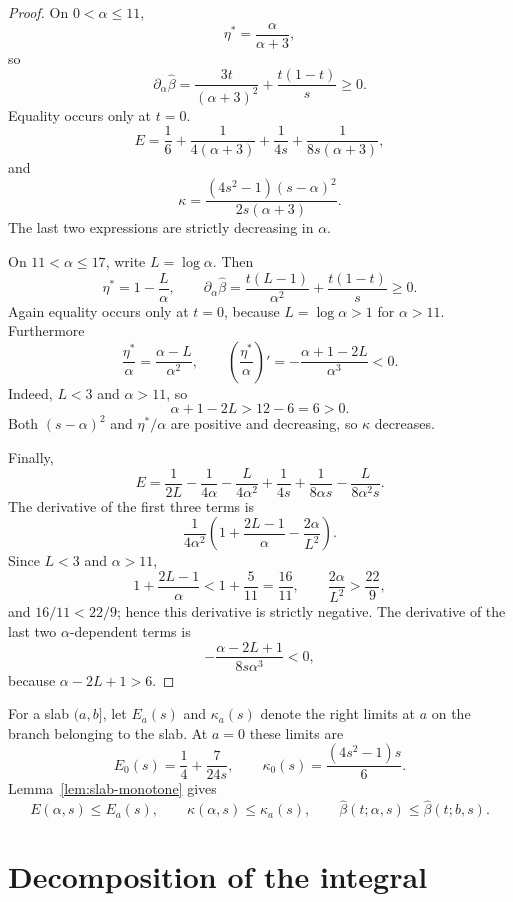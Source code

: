 \documentclass[11pt]{amsart}
\theoremstyle{definition}
\newcommand{\etaStar}{\eta^{\ast}}
\newcommand{\betaHat}{\widehat\beta}
\begin{document}
\begin{proof}
On $0<\alpha\le11$,
\[
 \etaStar=\frac{\alpha}{\alpha+3},
\]
so
\[
 \partial_\alpha\betaHat
 =\frac{3t}{(\alpha+3)^2}+\frac{t(1-t)}s\ge0.
\]
Equality occurs only at $t=0$.
\[
 E=\frac16+\frac1{4(\alpha+3)}
 +\frac1{4s}+\frac1{8s(\alpha+3)},
\]
and
\[
 \kappa
 =\frac{(4s^2-1)(s-\alpha)^2}{2s(\alpha+3)}.
\]
The last two expressions are strictly decreasing in $\alpha$.

On $11<\alpha\le17$, write $L=\log\alpha$.  Then
\[
 \etaStar=1-\frac L\alpha,
 \qquad
 \partial_\alpha\betaHat
 =\frac{t(L-1)}{\alpha^2}+\frac{t(1-t)}s\ge0.
\]
Again equality occurs only at $t=0$, because $L=\log\alpha>1$ for $\alpha>11$.
Furthermore
\[
 \frac{\etaStar}{\alpha}
 =\frac{\alpha-L}{\alpha^2},
 \qquad
 \left(\frac{\etaStar}{\alpha}\right)'
 =-\frac{\alpha+1-2L}{\alpha^3}<0.
\]
Indeed, $L<3$ and $\alpha>11$, so
\[
 \alpha+1-2L>12-6=6>0.
\]
Both $(s-\alpha)^2$ and $\etaStar/\alpha$ are positive and decreasing, so $\kappa$ decreases.

Finally,
\[
 E=
 \frac1{2L}-\frac1{4\alpha}-\frac{L}{4\alpha^2}
 +\frac1{4s}+\frac1{8\alpha s}-\frac{L}{8\alpha^2s}.
\]
The derivative of the first three terms is
\[
 \frac1{4\alpha^2}
 \left(1+\frac{2L-1}{\alpha}-\frac{2\alpha}{L^2}\right).
\]
Since $L<3$ and $\alpha>11$,
\[
 1+\frac{2L-1}{\alpha}
 <1+\frac5{11}=\frac{16}{11},
 \qquad
 \frac{2\alpha}{L^2}>\frac{22}{9},
\]
and $16/11<22/9$; hence this derivative is strictly negative.  The derivative of the last two $\alpha$-dependent terms is
\[
 -\frac{\alpha-2L+1}{8s\alpha^3}<0,
\]
because $\alpha-2L+1>6$.
\end{proof}

For a slab $(a,b]$, let $E_a(s)$ and $\kappa_a(s)$ denote the right limits at $a$ on the branch belonging to the slab.  At $a=0$ these limits are
\begin{equation}\label{eq:a0-limits}
 E_0(s)=\frac14+\frac7{24s},
 \qquad
 \kappa_0(s)=\frac{(4s^2-1)s}{6}.
\end{equation}
Lemma~\ref{lem:slab-monotone} gives
\begin{equation}\label{eq:slab-majorization}
 E(\alpha,s)\le E_a(s),
 \qquad
 \kappa(\alpha,s)\le\kappa_a(s),
 \qquad
 \betaHat(t;\alpha,s)\le\betaHat(t;b,s).
\end{equation}

\section{Decomposition of the integral}\label{sec:decomposition}
\end{document}

